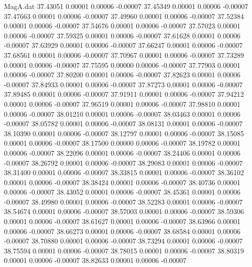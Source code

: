 \begin{filecontents}{MagA.dat}
  37.43051    0.00001    0.00006   -0.00007
  37.45349    0.00001    0.00006   -0.00007
  37.47663    0.00001    0.00006   -0.00007
  37.49960    0.00001    0.00006   -0.00007
  37.52384    0.00001    0.00006   -0.00007
  37.54676    0.00001    0.00006   -0.00007
  37.57023    0.00001    0.00006   -0.00007
  37.59325    0.00001    0.00006   -0.00007
  37.61628    0.00001    0.00006   -0.00007
  37.63929    0.00001    0.00006   -0.00007
  37.66247    0.00001    0.00006   -0.00007
  37.68561    0.00001    0.00006   -0.00007
  37.70967    0.00001    0.00006   -0.00007
  37.73289    0.00001    0.00006   -0.00007
  37.75595    0.00000    0.00006   -0.00007
  37.77903    0.00001    0.00006   -0.00007
  37.80200    0.00001    0.00006   -0.00007
  37.82623    0.00001    0.00006   -0.00007
  37.84933    0.00001    0.00006   -0.00007
  37.87273    0.00001    0.00006   -0.00007
  37.89485    0.00001    0.00006   -0.00007
  37.91911    0.00001    0.00006   -0.00007
  37.94212    0.00001    0.00006   -0.00007
  37.96519    0.00001    0.00006   -0.00007
  37.98810    0.00001    0.00006   -0.00007
  38.01210    0.00001    0.00006   -0.00007
  38.03463    0.00001    0.00006   -0.00007
  38.05782    0.00001    0.00006   -0.00007
  38.08131    0.00001    0.00006   -0.00007
  38.10390    0.00001    0.00006   -0.00007
  38.12797    0.00001    0.00006   -0.00007
  38.15085    0.00001    0.00006   -0.00007
  38.17500    0.00000    0.00006   -0.00007
  38.19782    0.00001    0.00006   -0.00007
  38.22096    0.00001    0.00006   -0.00007
  38.24406    0.00001    0.00006   -0.00007
  38.26792    0.00001    0.00006   -0.00007
  38.29083    0.00001    0.00006   -0.00007
  38.31400    0.00001    0.00006   -0.00007
  38.33815    0.00001    0.00006   -0.00007
  38.36102    0.00001    0.00006   -0.00007
  38.38424    0.00001    0.00006   -0.00007
  38.40736    0.00001    0.00006   -0.00007
  38.43052    0.00001    0.00006   -0.00007
  38.45361    0.00001    0.00006   -0.00007
  38.49980    0.00001    0.00006   -0.00007
  38.52283    0.00001    0.00006   -0.00007
  38.54674    0.00001    0.00006   -0.00007
  38.57003    0.00001    0.00006   -0.00007
  38.59306    0.00001    0.00006   -0.00007
  38.61627    0.00001    0.00006   -0.00007
  38.63966    0.00001    0.00006   -0.00007
  38.66273    0.00001    0.00006   -0.00007
  38.68584    0.00001    0.00006   -0.00007
  38.70880    0.00001    0.00006   -0.00007
  38.73294    0.00001    0.00006   -0.00007
  38.75594    0.00001    0.00006   -0.00007
  38.78015    0.00001    0.00006   -0.00007
  38.80319    0.00001    0.00006   -0.00007
  38.82633    0.00001    0.00006   -0.00007

\end{filecontents}
